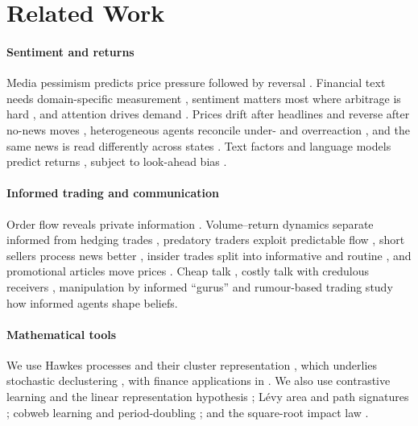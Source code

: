 \documentclass[10pt,twocolumn,letterpaper]{article}
\theoremstyle{plain}
\theoremstyle{definition}
\theoremstyle{remark}
\begin{document}
\section{Related Work}\label{sec:related}

\paragraph{Sentiment and returns} Media pessimism predicts price pressure followed by reversal \citep{tetlock2007}. Financial text needs domain-specific measurement \citep{loughran2011}, sentiment matters most where arbitrage is hard \citep{baker2006,shleifer1997,delong1990}, and attention drives demand \citep{barber2008,da2011}. Prices drift after headlines and reverse after no-news moves \citep{chan2003}, heterogeneous agents reconcile under- and overreaction \citep{hong1999}, and the same news is read differently across states \citep{veronesi1999}. Text factors and language models predict returns \citep{ke2019,araci2019,lopezlira2023}, subject to look-ahead bias \citep{glasserman2023}.

\paragraph{Informed trading and communication} Order flow reveals private information \citep{kyle1985,glosten1985}. Volume--return dynamics separate informed from hedging trades \citep{llorente2002}, predatory traders exploit predictable flow \citep{brunnermeier2005}, short sellers process news better \citep{engelberg2012}, insider trades split into informative and routine \citep{cohen2012}, and promotional articles move prices \citep{kogan2023}. Cheap talk \citep{crawford1982}, costly talk with credulous receivers \citep{kartik2007}, manipulation by informed ``gurus'' \citep{benabou1992} and rumour-based trading \citep{vanbommel2003} study how informed agents shape beliefs.

\paragraph{Mathematical tools} We use Hawkes processes \citep{hawkes1971} and their cluster representation \citep{hawkesoakes1974}, which underlies stochastic declustering \citep{zhuang2002}, with finance applications in \citep{bacry2015}. We also use contrastive learning \citep{oord2018,reimers2019} and the linear representation hypothesis \citep{park2023}; L\'evy area and path signatures \citep{levy1940,lyons1998,chevyrev2016}; cobweb learning and period-doubling \citep{ezekiel1938,evans2001,may1976}; and the square-root impact law \citep{bouchaud2018}.
\end{document}
